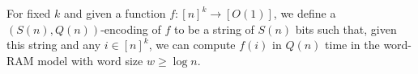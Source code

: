 \begin{definition}[label=def:encoding,restate=DefinitionEncoding]
  For fixed \(k\) and given a function \(f : {[n]}^k \to [O(1)]\), we define
  a \((S(n),Q(n))\)-encoding of \(f\) to be a string of \(S(n)\) bits such
  that, given this string and any \(i \in {[n]}^k\), we can compute \(f(i)\)
  in \(Q(n)\) time in the word-RAM model with word size \(w \geq \log
  n\).
\end{definition}
